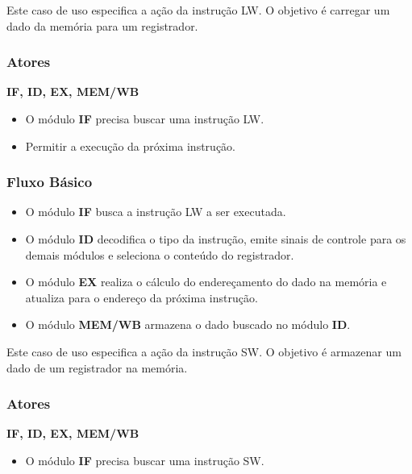 
Este caso de uso especifica a ação da instrução LW. O objetivo é carregar um dado da memória para um registrador.
 
\subsubsection*{Atores}
\textbf{IF, ID, EX, MEM/WB}

\preconditions 
\begin{itemize}
 \item O módulo \textbf{IF} precisa buscar uma instrução LW.
\end{itemize}

\postconditions
\begin{itemize}
  \item Permitir a execução da próxima instrução.
\end{itemize}

\subsubsection*{Fluxo Básico}
\begin{itemize}
\item O módulo \textbf{IF} busca a instrução LW a ser executada.
\item O módulo \textbf{ID} decodifica o tipo da instrução, emite sinais de controle para os demais módulos e seleciona o conteúdo do registrador.
\item O módulo \textbf{EX} realiza o cálculo do endereçamento do dado na memória e atualiza para o endereço da próxima instrução.
\item O módulo \textbf{MEM/WB} armazena o dado buscado no módulo \textbf{ID}.
\end{itemize}


Este caso de uso especifica a ação da instrução SW. O objetivo é armazenar um dado de um registrador na memória.

\subsubsection*{Atores}
\textbf{IF, ID, EX, MEM/WB}

\preconditions 
\begin{itemize}
	\item O módulo \textbf{IF} precisa buscar uma instrução SW.
\end{itemize}

